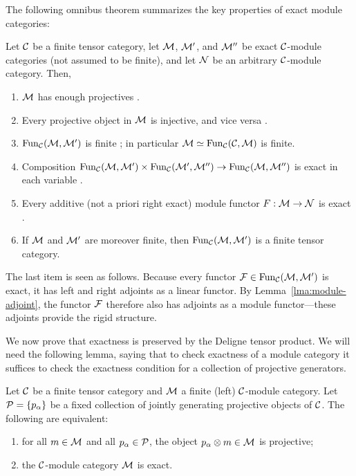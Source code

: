 \documentclass{amsart}
\begin{document}
The following omnibus theorem summarizes the key properties of exact module categories: 
\begin{theorem} \label{Thm:ExactModCatOmnibus}
	Let $\mathcal C$ be a finite tensor category, let $\mathcal M$, $\mathcal M'$, and $\mathcal M''$ be exact $\mathcal C$-module categories (not assumed to be finite), and let $\mathcal N$ be an arbitrary $\mathcal C$-module category. Then,
	\begin{enumerate}
		\item $\mathcal M$ has enough projectives \cite[Lemma 3.4]{EO-ftc} \cite[Lemma 2.7.1]{EGNO}.
		\item Every projective object in $\mathcal M$  is injective, and vice versa \cite[Cor. 3.6]{EO-ftc} \cite[Cor 2.7.4]{EGNO}.
		\item $\operatorname{Fun}_{\mathcal C}(\mathcal M, \mathcal M')$ is finite \cite[Prop 2.13.5]{EGNO}; in particular $\mathcal M \simeq \operatorname{Fun}_{\mathcal C}(\mathcal C, \mathcal M)$ is finite. %
		\item Composition $\operatorname{Fun}_{\mathcal C}(\mathcal M, \mathcal M') \times \operatorname{Fun}_{\mathcal C}(\mathcal M', \mathcal M'') \to \operatorname{Fun}_{\mathcal C}(\mathcal M, \mathcal M'')$ is exact in each variable \cite[Lemma 3.20]{EO-ftc} \cite[Lemma 2.13.2]{EGNO}	.	
		\item Every additive (not a priori right exact) module functor $F:\mathcal M \to \mathcal N$ is exact \cite[Prop. 3.11]{EO-ftc} \cite[Prop 2.7.8]{EGNO}.
		\item If $\mathcal M$ and $\mathcal M'$ are moreover finite, then $\operatorname{Fun}_{\mathcal C}(\mathcal M,\mathcal M')$ is a finite tensor category.
	\end{enumerate}
\end{theorem}
\noindent The last item is seen as follows.  Because every functor $\mathcal F \in \operatorname{Fun}_{\mathcal C}(\mathcal M,\mathcal M')$ is exact, it has left and right adjoints as a linear functor.  By Lemma~\ref{lma:module-adjoint}, the functor $\mathcal F$ therefore also has adjoints as a module functor---these adjoints provide the rigid structure.

We now prove that exactness is preserved by the Deligne tensor product.  We will need the following lemma, saying that to check exactness of a module category it suffices to check the exactness condition for a collection of projective generators. 

\begin{lemma} \label{lma:Exact_checked_on_proj_gens}
	Let $\mathcal C$ be a finite tensor category and $\mathcal M$ a finite (left) $\mathcal C$-module category. Let $\mathcal P = \{ p_\alpha \}$ be a fixed collection of jointly generating projective objects of  $\mathcal C$. The following are equivalent:
	\begin{enumerate}
		\item for all $m \in \mathcal M$ and all $p_\alpha \in \mathcal P$, the object $p_\alpha \otimes m \in \mathcal M$ is projective;
		\item the $\mathcal C$-module category $\mathcal M$ is exact.
	\end{enumerate}
\end{lemma}
\end{document}

